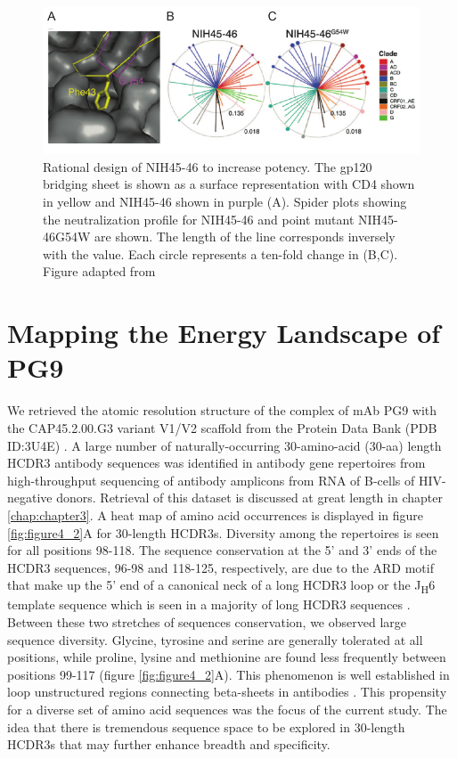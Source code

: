 \begin{figure}
   \centering
   \includegraphics{images/chapter4/figure4_1.pdf} %
   \caption[Rational Design of NIH45-46 to Increase Potency]{Rational design of NIH45-46 to increase potency. The gp120 bridging sheet is shown as a surface representation with CD4 shown in yellow and NIH45-46 shown in purple (A). Spider plots showing the neutralization profile for NIH45-46 and point mutant NIH45-46G54W are shown. The length of the line corresponds inversely with the \ic value. Each circle represents a ten-fold change in \ic (B,C). Figure adapted from \citep{Diskin:2011hl}}
   \label{fig:figure4_1}
\end{figure} 

\section{Mapping the Energy Landscape of PG9}
\label{sec:mapping}
We retrieved the atomic resolution structure of the complex of mAb PG9 with the CAP45.2.00.G3 variant V1/V2 scaffold from the Protein Data Bank (PDB ID:3U4E) \citep{McLellan:2011dg}. A large number of naturally-occurring 30-amino-acid (30-aa) length HCDR3 antibody sequences was identified in antibody gene repertoires from high-throughput sequencing of antibody amplicons from RNA of B-cells of HIV-negative donors. Retrieval of this dataset is discussed at great length in chapter \ref{chap:chapter3}. A heat map of amino acid occurrences is displayed in figure \ref{fig:figure4_2}A for 30-length HCDR3s. Diversity among the repertoires is seen for all positions 98-118. The sequence conservation at the 5' and 3' ends of the HCDR3 sequences, 96-98 and 118-125, respectively, are due to the ARD motif that make up the 5' end of a canonical neck of a long HCDR3 loop or the J\textsubscript{H}6 template sequence which is seen in a majority of long HCDR3 sequences \citep{North:2011dv,Briney:2012ib}. Between these two stretches of sequences conservation, we observed large sequence diversity. Glycine, tyrosine and serine are generally tolerated at all positions, while proline, lysine and methionine are found less frequently between positions 99-117 (figure \ref{fig:figure4_2}A). This phenomenon is well established in loop unstructured regions connecting beta-sheets in antibodies \citep{Minuchehr:2005wc,De:2005in}.  This propensity for a diverse set of amino acid sequences was the focus of the current study. The idea that there is tremendous sequence space to be explored in 30-length HCDR3s that may further enhance breadth and specificity.

